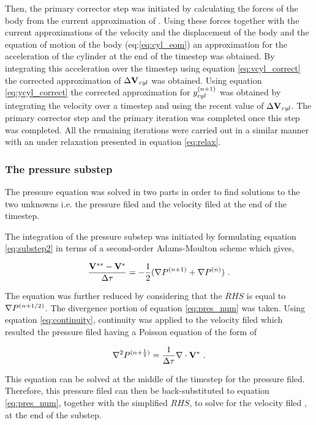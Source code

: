  Then, the primary corrector step was initiated by calculating the forces of the body from the current approximation of \Vnext. Using these forces together with the current approximations of the velocity and the displacement of the body and the equation of motion of the body (eq:\ref{eq:cyl_eom}) an approximation for the acceleration of the cylinder at the end of the timestep was obtained. By integrating this acceleration over the timestep using equation \ref{eq:vcyl_correct} the corrected approximation of $\Delta\mathbf{V}_{\mathit{cyl}}$ was obtained. Using equation \ref{eq:ycyl_correct} the corrected approximation for $y_{cyl}^{(n+1)}$  was obtained by integrating the velocity over a timestep and using the recent value of $\Delta\mathbf{V}_{\mathit{cyl}}$. The primary corrector step and the primary iteration was completed once this step was completed. All the remaining iterations were carried out in a similar manner with an under relaxation presented in equation \ref{eq:relax}. 
 
 
\subsubsection{The pressure substep}

The pressure equation was solved in two parts in order to find solutions to the two unknowns i.e. the pressure filed and the velocity filed at the end of the timestep. 
 
The integration of the pressure substep was initiated by formulating equation \ref{eq:substep2} in terms of a second-order Adams-Moulton scheme which gives,
 
\begin{equation} \centering
\label{eq:pres_num}
\frac{\Vintint - \Vint}{\Delta\tau} = -\frac{1}{2}(\grad\Pres^{(n+1)} + \grad\Pres^{(n)}) ~.
\end{equation}

The equation was further reduced by considering that the $RHS$ is equal to $\nabla P^{(n+1/2)}$. The divergence portion of equation \ref{eq:pres_num} was taken. Using equation \ref{eq:continuity}, continuity was applied to the velocity filed which resulted the pressure filed having a Poisson equation of the form of 

\begin{equation} \centering
\label{eq:poisson}
\gradsq\Pres^{(n+\frac{1}{2})} = \frac{1}{\Delta\tau}\divergence{\Vint} ~.
\end{equation} 

This equation can be solved at the middle of the timestep for the pressure filed. Therefore, this pressure filed can then be back-substituted to equation \ref{eq:pres_num}, together with the simplified $RHS$, to solve for the velocity filed \Vintint, at the end of the substep. 

